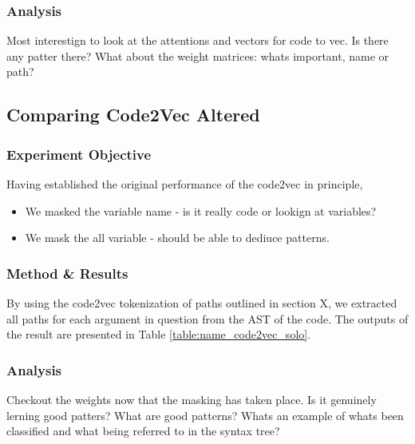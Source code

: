 \subsubsection{Analysis} %
\label{ssub:analysis}

Most interestign to look at the attentions and vectors for code to vec. Is there any patter there?
What about the weight matrices: whats important, name or path?


\subsection{Comparing Code2Vec Altered} %
\label{sub:comparing_code2vec_altered}

\subsubsection{Experiment Objective} %
Having established the original performance of the code2vec in principle, 
\begin{itemize}
    \item We masked the variable name - is it really code or lookign at variables?
    \item We mask the all variable - should be able to dediuce patterns.
\end{itemize}


\subsubsection{Method \& Results} %

By using the code2vec tokenization of paths outlined in section X, we extracted all paths for each argument in question from the AST of the code. 
The outputs of the result are presented in Table \ref{table:name_code2vec_solo}.

\subsubsection{Analysis} %

Checkout the weights now that the masking has taken place. Is it genuinely lerning good patters? What are good patterns? Whats an example of whats been classified and what being referred to in the syntax tree?


